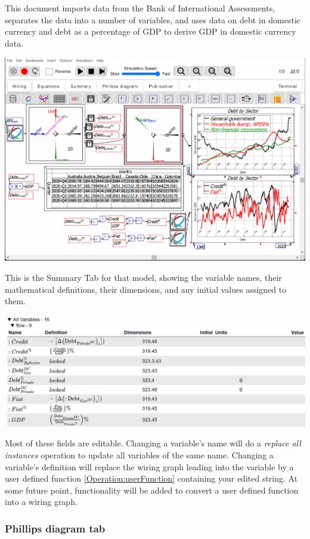 This document imports data from the Bank of International Assessments,
separates the data into a number of variables, and uses data on debt
in domestic currency and debt as a percentage of GDP to derive GDP
in domestic currency data.

\noindent\includegraphics[width=\textwidth]{images/DebtCalcGDPexample}

This is the Summary Tab for that model, showing the variable names,
their mathematical definitions, their dimensions, and any initial
values assigned to them.

\noindent\includegraphics[width=\textwidth]{images/DebtCalcGDPexampleSummaryTab}

Most of these fields are editable. Changing a variable's name will
do a \emph{replace all instances} operation to update all variables
of the same name. Changing a variable's definition will replace the
wiring graph leading into the variable by a user defined function
\ref{Operation:userFunction} containing your edited string. At some
future point, functionality will be added to convert a user defined
function into a wiring graph.

\subsubsection{Phillips diagram tab}

